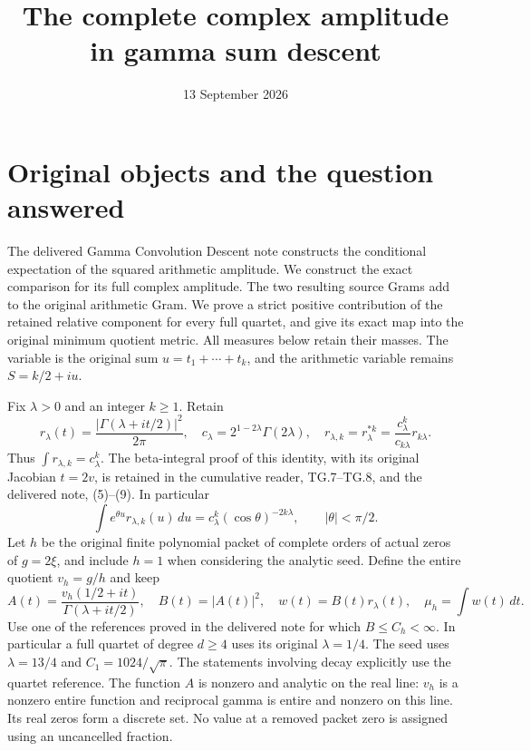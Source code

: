 \documentclass[11pt]{article}
\title{The complete complex amplitude in gamma sum descent}
\author{}
\date{13 September 2026}
\begin{document}
\maketitle

\section{Original objects and the question answered}
The delivered Gamma Convolution Descent note constructs the conditional
expectation of the squared arithmetic amplitude. We construct the exact
comparison for its full complex amplitude. The two resulting source
Grams add to the original arithmetic Gram. We prove a strict positive
contribution of the retained relative component for every full quartet,
and give its exact map into the original minimum quotient metric.
All measures below retain their masses. The variable is the original
sum $u=t_1+\cdots+t_k$, and the arithmetic variable remains $S=k/2+iu$.

Fix $\lambda>0$ and an integer $k\geq1$. Retain
\begin{equation}
 r_\lambda(t)=\frac{|\Gamma(\lambda+it/2)|^2}{2\pi},\quad
 c_\lambda=2^{1-2\lambda}\Gamma(2\lambda),\quad
 r_{\lambda,k}=r_\lambda^{*k}=
 \frac{c_\lambda^k}{c_{k\lambda}}r_{k\lambda}.
 \tag{GP.1}
\end{equation}
Thus $\int r_{\lambda,k}=c_\lambda^k$. The beta-integral proof of
this identity, with its original Jacobian $t=2v$, is retained in
the cumulative reader, TG.7--TG.8, and the delivered note, (5)--(9).
In particular
\begin{equation}
 \int e^{\theta u}r_{\lambda,k}(u)\,du
       =c_\lambda^k(\cos\theta)^{-2k\lambda},
       \qquad |\theta|<\pi/2.
 \tag{GP.2}
\end{equation}
Let $h$ be the original finite polynomial packet of complete orders of
actual zeros of $g=2\xi$, and include $h=1$ when considering the analytic
seed. Define the entire quotient $v_h=g/h$ and keep
\begin{equation}
 A(t)=\frac{v_h(1/2+it)}{\Gamma(\lambda+it/2)},\quad
 B(t)=|A(t)|^2,\quad w(t)=B(t)r_\lambda(t),\quad
 \mu_h=\int w(t)\,dt.
 \tag{GP.3}
\end{equation}
Use one of the references proved in the delivered note for which
$B\leq C_h<\infty$. In particular a full quartet of degree $d\geq4$
uses its original $\lambda=1/4$. The seed uses $\lambda=13/4$ and
$C_1=1024/\sqrt\pi$. The statements involving decay explicitly use
the quartet reference. The function $A$ is nonzero and analytic on
the real line: $v_h$ is a nonzero entire function and reciprocal gamma
is entire and nonzero on this line. Its real zeros form a discrete
set. No value at a removed packet zero is assigned using an uncancelled
fraction.
\end{document}
